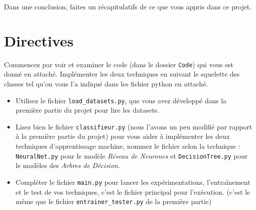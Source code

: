 \documentclass[latter,12pt]{article}
\begin{document}
Dans une conclusion, faites un récapitulatifs de ce que vous appris dans ce projet.


\section{Directives}
Commencez par voir et examiner le code (dans le dossier \verb!Code!) qui vous est donné en attaché. Implémenter les deux techniques en suivant le squelette des classes tel qu'on vous l'a indiqué dans les fichier python en attaché.
\begin{itemize}
\item Utilisez le fichier \verb!load_datasets.py!, que vous avez développé dans la première partie du projet pour lire les datasets.

\item Lisez bien le fichier \verb!classifieur.py! (nous l'avons un peu modifié par rapport à la première partie du projet) pour vous aider à implémenter les deux techniques d'apprentissage machine, nommez le fichier selon la technique : \verb!NeuralNet.py! pour le modèle \emph{Réseau de Neurones} et \verb!DecisionTree.py! pour le modèles des \emph{Arbres de Décision}.

\item Compléter le fichier \verb!main.py! pour lancer les expérimentations, l'entraînement et le test de vos techniques, c'est le fichier principal pour l'exécution. (c'est le même que le fichier \verb!entrainer_tester.py! de la première partie)
\end{itemize}
\end{document}
